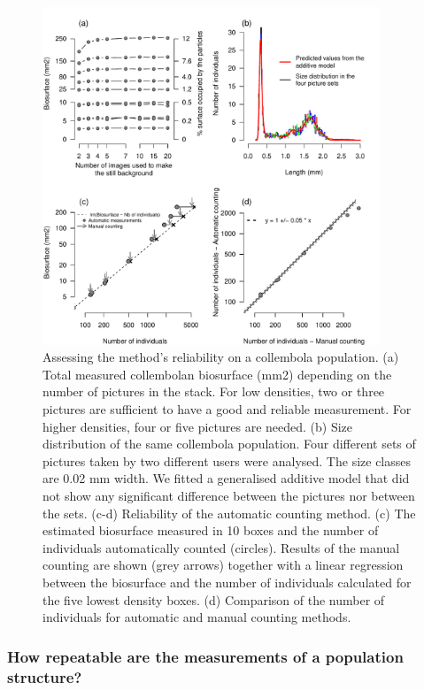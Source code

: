 \begin{figure}[!h] %
\centering
\includegraphics[width=0.90\textwidth]{2_Methodo/Fig/6_Plugin_multiP.pdf}
\caption[  Assessing the method's reliability on a collembola population]{ Assessing the method's reliability on a collembola population. (a) Total measured collembolan biosurface (mm2) depending on the number of pictures
in the stack. For low densities, two or three pictures are sufficient to have a
good and reliable measurement. For higher densities, four or five pictures are
needed. (b) Size distribution of the same collembola population. Four different
sets of pictures taken by two different users were analysed. The size classes
are 0.02 mm width. We fitted a generalised additive model that did not show any
significant difference between the pictures nor between the sets. (c-d)
Reliability of the automatic counting method. (c) The estimated biosurface
measured in 10 boxes and the number of individuals automatically counted
(circles). Results of the manual counting are shown (grey arrows) together with
a linear regression between the biosurface and the number of individuals
calculated for the five lowest density boxes. (d) Comparison of the number of
individuals for automatic and manual counting methods.
}
\label{Fig21-6}
\end{figure}

\subsubsection{How repeatable are the measurements of a population structure?}

